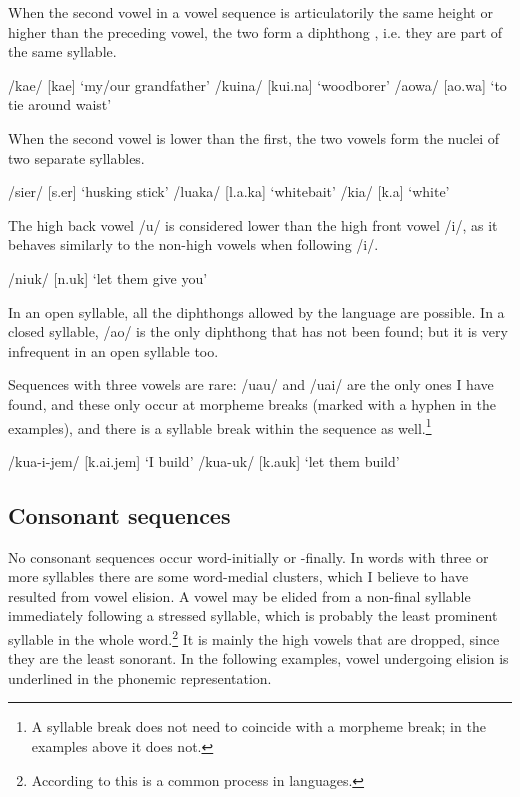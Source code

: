 When the second vowel in a vowel sequence is articulatorily the same height or higher than the preceding vowel, the two form a diphthong , i.e. they are part of the same syllable.

\ea
\ea
/kae/  [{{\textprimstress}kae}]  `my/our grandfather'
\ex
/kuina/  [{{\textprimstress}kui.na}]  `woodborer'
\ex
/aowa/  [{{\textprimstress}ao.wa}]  `to tie around waist'
\z
\z


When the second vowel is lower than the first, the two vowels form the nuclei of two separate syllables. 

\ea
\ea
/sier/  [s{\textsci}.{{\textprimstress}er}]  `husking stick'
\ex
/luaka/  [l{\textupsilon}.{{\textprimstress}a.ka}]  `whitebait'
\ex
/kia/  [k{\textsci}.{{\textprimstress}a}]  `white'
\z
\z


The high back vowel /u/ is considered lower than the high front vowel /i/, as it behaves similarly to the non-high vowels when following /i/.

\ea
/niuk/  [n{\textsci}.{{\textprimstress}uk}]  `let them give you'
\z

In an open syllable, all the diphthongs allowed by the language are possible. In a closed syllable, /ao/ is the only diphthong that has not been found; but it is very infrequent in an open syllable too. 

Sequences with three vowels are rare: /uau/ and /uai/ are the only ones I have found, and these only occur at morpheme breaks (marked with a hyphen in the examples), and there is a syllable break within the sequence as well.\footnote{A syllable break does not need to coincide with a morpheme break; in the examples above it does not.}  

\ea
\ea
/kua-i-jem/    [k{\textupsilon}.{{\textprimstress}}ai.jem]      `I build'
\ex
/kua-uk/      [k{\textupsilon}.{{\textprimstress}a}uk]      `let them build'
\z
\z

\subsection{Consonant sequences} \label{sec:2.2.3:consseq}\label{sec:2:y:x}

No consonant sequences occur word-initially or -finally. In words with three or more syllables there are some word-medial clusters, which I believe to have resulted from vowel elision.  A vowel may be elided from a non-final syllable immediately following a stressed syllable, which is probably the least prominent syllable in the whole word.\footnote{According to \citet[11]{Sommerstein1977} this is a common process in languages.} It is mainly the high vowels that are dropped, since they are the least sonorant. In the following examples, vowel undergoing elision is underlined in the phonemic representation.

